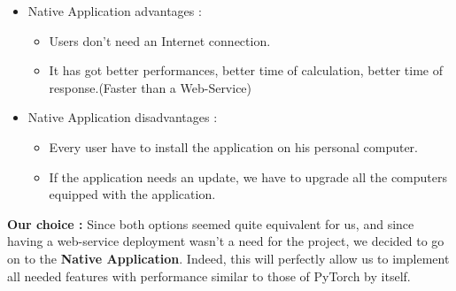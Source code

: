   \begin{itemize}
    \item Native Application advantages :
    \begin{itemize}
        \item Users don't need an Internet connection.
        \item It has got better performances, better time of calculation, better time of response.(Faster than a Web-Service)
    \end{itemize}
\end{itemize}
\begin{itemize}
    \item Native Application disadvantages :
    \begin{itemize}
        \item Every user have to install the application on his personal computer.
         \item If the application needs an update, we have to upgrade all the computers equipped with the application.
    \end{itemize}
\end{itemize}

\textbf{Our choice :}
Since both options seemed quite equivalent for us, and since having a web-service deployment wasn't a need for the project, we decided to go on to the \textbf{Native Application}. Indeed, this will perfectly allow us to implement all needed features with performance similar to those of PyTorch by itself.


\pagebreak
